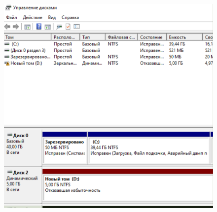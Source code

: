 \documentclass[a4paper,14pt]{extarticle}
\begin{document}
\begin{enumerate}
		\begin{figure}
			\centering
			\includegraphics[width=0.7\linewidth]{screenshot001}
			\caption{}
			\label{fig:screenshot001}
		\end{figure}
	

\end{enumerate}
\end{document}
